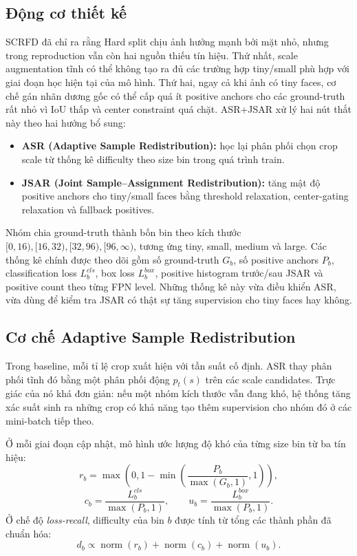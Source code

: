 \subsection{Động cơ thiết kế}

SCRFD đã chỉ ra rằng Hard split chịu ảnh hưởng mạnh bởi mặt nhỏ, nhưng trong reproduction vẫn còn hai nguồn thiếu tín hiệu. Thứ nhất, scale augmentation tĩnh có thể không tạo ra đủ các trường hợp tiny/small phù hợp với giai đoạn học hiện tại của mô hình. Thứ hai, ngay cả khi ảnh có tiny faces, cơ chế gán nhãn dương gốc có thể cấp quá ít positive anchors cho các ground-truth rất nhỏ vì IoU thấp và center constraint quá chặt. ASR+JSAR xử lý hai nút thắt này theo hai hướng bổ sung:
\begin{itemize}
  \item \textbf{ASR (Adaptive Sample Redistribution):} học lại phân phối chọn crop scale từ thống kê difficulty theo size bin trong quá trình train.
  \item \textbf{JSAR (Joint Sample--Assignment Redistribution):} tăng mật độ positive anchors cho tiny/small faces bằng threshold relaxation, center-gating relaxation và fallback positives.
\end{itemize}

Nhóm chia ground-truth thành bốn bin theo kích thước \([0,16), [16,32), [32,96), [96,\infty)\), tương ứng tiny, small, medium và large. Các thống kê chính được theo dõi gồm số ground-truth \(G_b\), số positive anchors \(P_b\), classification loss \(L^{cls}_b\), box loss \(L^{box}_b\), positive histogram trước/sau JSAR và positive count theo từng FPN level. Những thống kê này vừa điều khiển ASR, vừa dùng để kiểm tra JSAR có thật sự tăng supervision cho tiny faces hay không.

\subsection{Cơ chế Adaptive Sample Redistribution}

Trong baseline, mỗi tỉ lệ crop xuất hiện với tần suất cố định. ASR thay phân phối tĩnh đó bằng một phân phối động \(p_t(s)\) trên các scale candidates. Trực giác của nó khá đơn giản: nếu một nhóm kích thước vẫn đang khó, hệ thống tăng xác suất sinh ra những crop có khả năng tạo thêm supervision cho nhóm đó ở các mini-batch tiếp theo.

Ở mỗi giai đoạn cập nhật, mô hình ước lượng độ khó của từng size bin từ ba tín hiệu:
\[
r_b = \max\left(0, 1 - \min\left(\frac{P_b}{\max(G_b,1)}, 1\right)\right),
\]
\[
c_b = \frac{L^{cls}_b}{\max(P_b,1)}, \qquad
u_b = \frac{L^{box}_b}{\max(P_b,1)}.
\]
Ở chế độ \textit{loss-recall}, difficulty của bin \(b\) được tính từ tổng các thành phần đã chuẩn hóa:
\[
d_b \propto \operatorname{norm}(r_b)+\operatorname{norm}(c_b)+\operatorname{norm}(u_b).
\]

